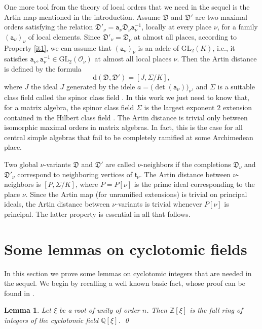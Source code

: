 \documentclass{article}
\newtheorem{Lem}[Prop]{Lemma}
\theoremstyle{definition}
\theoremstyle{remark}
\begin{document}
One more tool from the theory of local orders that we need 
in the sequel is the Artin map mentioned in the introduction.
Assume $\mathfrak{D}$ and $\mathfrak{D}'$ are two
maximal orders satisfying the relation
$\mathfrak{D}'_\nu=
\mathtt{a}_\nu\mathfrak{D}_\nu\mathtt{a}_\nu^{-1}$,
locally at every place $\nu$,
for a family $\left(\mathtt{a}_\nu\right)_\nu$
of local elements. Since $\mathfrak{D}'_\nu=\mathfrak{D}_\nu$
at almost all places, according to Property \ref{it1},
we can assume that $\left(\mathtt{a}_\nu\right)_\nu$ is an 
adele of $\mathrm{GL}_2(K)$, i.e., it satisfies
$\mathtt{a}_\nu,\mathtt{a}_\nu^{-1}\in
\mathrm{GL}_2(\mathcal{O}_\nu)$ at almost all local places
$\nu$. Then the Artin distance is defined by the formula 
$$\mathrm{d}(\mathfrak{D},\mathfrak{D}')=[J,\Sigma/K],$$
where $J$ the ideal $J$ generated by
the idele $a=\big(\det(\mathtt{a}_\nu)\big)_\nu$,
and $\Sigma$ is a suitable class field called the 
spinor class field \cite[\S1]{A13}. In this work we just need
to know that, for a matrix algebra, the spinor class field $\Sigma$ is the largest exponent
$2$ extension contained in the Hilbert class field
\cite{A03}. 
The Artin distance is trivial only between isomorphic 
maximal orders in matrix algebras. In fact, this is
the case for all central simple algebras that fail to be
completely ramified at some Archimedean place.


Two global $\nu$-variants $\mathfrak{D}$ and $\mathfrak{D}'$ 
are called $\nu$-neighbors if the completions 
$\mathfrak{D}_\nu$ and $\mathfrak{D}'_\nu$ correspond to neighboring
vertices of $\mathfrak{t}_\nu$.
The Artin distance between $\nu$-neighbors is $[P,\Sigma/K]$, where $P=P[\nu]$ is the prime ideal 
corresponding to the place $\nu$.
Since the Artin map (for unramified extensions) is trivial on principal ideals, the Artin distance between $\nu$-variants is trivial whenever
$P[\nu]$ is principal. The latter property
is essential in all that follows.



\section{Some lemmas on cyclotomic fields}


 In this section we prove some
lemmas on cyclotomic integers that
are needed in the sequel. We begin by recalling a well
known basic fact, whose proof can be found in \cite[\S I.10.2]{N99}.

\begin{Lem}\label{lc1}
    Let $\xi$ be a root of unity of order $n$. Then $\mathbb{Z}[\xi]$ 
    is the full ring of integers of the cyclotomic field 
    $\mathbb{Q}[\xi]$. \qed
\end{Lem}
\end{document}
